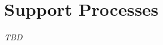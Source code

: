\documentclass[11pt]{article}
\begin{document}
\section{Support Processes}
\textit{TBD}








\end{document}
